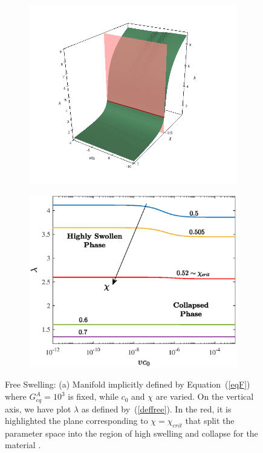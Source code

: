 \documentclass[runningheads]{llncs}
\begin{document}
\begin{figure}[h!]
	\begin{subfigure}{0.53\textwidth}
		\includegraphics[scale=0.25]{images/manifold}
		\caption{}
	\end{subfigure}
	\hspace{-5mm}
	\begin{subfigure}{0.46\textwidth}
		\hspace{-3mm}
		\includegraphics[scale=0.4]{images/free1}
		\caption{}
	\end{subfigure}
	\caption{Free Swelling: (a) Manifold implicitly defined by Equation~(\ref{eqF}) where $G^A_{eq}=10^3$ is fixed, while $c_0$ and $\chi$ are varied. On the vertical axis, we have plot $\lambda$ as defined by~(\ref{deffree}). In the red, it is highlighted the plane corresponding to $\chi=\chi_{crit}$ that split the parameter space into the region of high swelling and collapse for the material \cite{}.}
	\label{analysis}
\end{figure}
\end{document}

